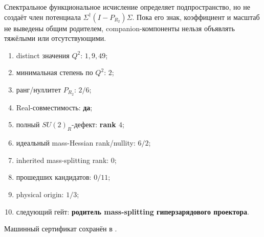 \begin{nogocriterion}
Спектральное функциональное исчисление определяет подпространство, но не
создаёт член потенциала $\Sigma^\dagger(I-P_{R_2})\Sigma$. Пока его знак,
коэффициент и масштаб не выведены общим родителем, companion-компоненты
нельзя объявлять тяжёлыми или отсутствующими.
\end{nogocriterion}

\begin{protocol}\begin{enumerate}
\item distinct значения $Q^2$: \textbf{$1,9,49$};
\item минимальная степень по $Q^2$: \textbf{$2$};
\item ранг/нуллитет $P_{R_2}$: \textbf{$2/6$};
\item Real-совместимость: \textbf{да};
\item полный $SU(2)_R$-дефект: \textbf{rank $4$};
\item идеальный mass-Hessian rank/nullity: \textbf{$6/2$};
\item inherited mass-splitting rank: \textbf{$0$};
\item прошедших кандидатов: \textbf{$0/11$};
\item physical origin: \textbf{$1/3$};
\item следующий гейт: \textbf{родитель mass-splitting гиперзарядового проектора}.
\end{enumerate}\end{protocol}

Машинный сертификат сохранён в
.